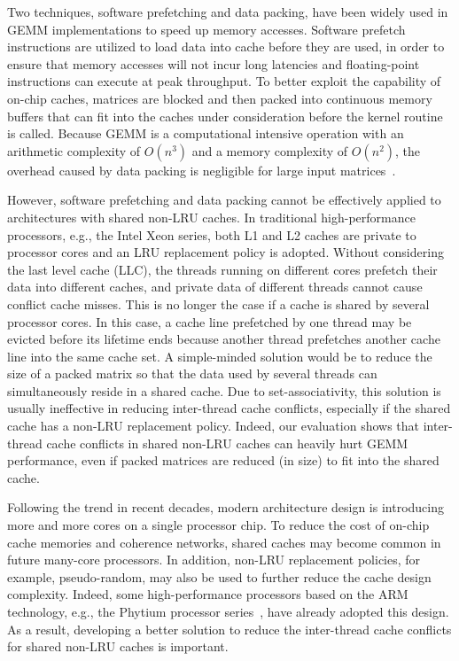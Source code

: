 Two techniques, software prefetching and data packing,
have been widely used in GEMM implementations to speed up memory accesses.
Software prefetch instructions are utilized
to load data into cache before they are used, in 
order to ensure that memory accesses will not incur
long latencies and floating-point instructions
can execute at peak throughput.
To better exploit the capability of on-chip caches,
matrices are blocked and then packed into continuous memory buffers
that can fit into the caches under consideration
before the kernel routine is called.
Because GEMM is a computational intensive operation 
with an 
arithmetic complexity of $O(n^3)$ and a memory complexity of $O(n^2)$,
the overhead caused by data packing is negligible for
large
input matrices~\cite{gotogemm}.


However, software prefetching and data packing cannot be effectively
applied to architectures with shared non-LRU caches.
In traditional high-performance processors, e.g., the Intel Xeon series,
both L1 and L2 caches are private to processor cores
and an LRU replacement policy is adopted.
Without considering the last level cache (LLC),
the threads running on different cores prefetch their data into
different caches, and private data of different threads
cannot cause conflict cache misses.
This is no longer the case if a cache is
shared by several processor cores.
In this case, a cache line prefetched by one thread
may be evicted before its lifetime ends because another thread prefetches
another cache line into the same cache set.
A simple-minded solution would be to reduce 
the size of a packed matrix
so that the data used by several threads can simultaneously reside in a shared cache.
Due to set-associativity,
this solution is usually ineffective in reducing
inter-thread cache conflicts,
especially if the shared cache has a non-LRU replacement policy.
Indeed,
our evaluation shows that inter-thread cache conflicts
in shared non-LRU caches
can heavily hurt GEMM performance,
even if packed matrices are reduced (in size)
to fit into the shared cache.

Following the trend in recent decades, modern architecture design
is introducing more and more cores on a single processor chip.
To reduce the cost of on-chip cache memories and coherence networks,
shared caches may become common in future many-core processors.
In addition, non-LRU replacement policies, for example, pseudo-random,
may also be used to further reduce the cache design complexity.
Indeed, some high-performance processors based on the
ARM technology, e.g., the Phytium processor series~\cite{phytium},
have already adopted this design. 
As a result, developing a better solution to reduce
the inter-thread cache conflicts 
for shared non-LRU caches is important.

